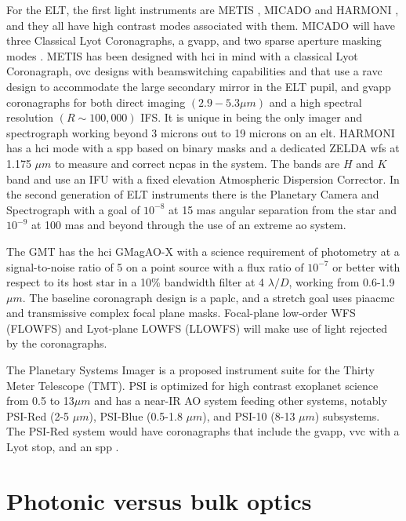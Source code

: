 \documentclass[letterpaper]{ar-1col}
\newcommand{\ld}{$\lambda/D$}
\begin{document}
For the ELT, the first light instruments are METIS \citep{Brandl22}, MICADO \citep{Sturm24} and HARMONI \citep{Thatte22}, and they all have high contrast modes associated with them.
%
MICADO will have three Classical Lyot Coronagraphs, a \ac{gvapp}, and two sparse aperture masking modes \citep{Huby24}. 
%
METIS has been designed with \ac{hci} in mind \citep{Kenworthy16,Absil24} with a classical Lyot Coronagraph, \ac{ovc} designs with beamswitching capabilities and that use a \ac{ravc} design to accommodate the large secondary mirror in the ELT pupil, and \ac{gvapp} coronagraphs for both direct imaging $(2.9-5.3\mu m)$ and a high spectral resolution $(R\sim 100,000)$ IFS.
%
It is unique in being the only imager and spectrograph working beyond 3 microns out to 19 microns on an \ac{elt}.
%
HARMONI has a \ac{hci} mode \citep{Houlle21} with a \ac{spp} based on binary masks \citep{Carlotti23} and a dedicated ZELDA \ac{wfs} at 1.175 $\mu m$ to measure and correct \acp{ncpa} in the system.
%
The bands are $H$ and $K$ band and use an IFU with a fixed elevation Atmospheric Dispersion Corrector.
%
In the second generation of ELT instruments there is the Planetary Camera and Spectrograph \citep[PCS; ][]{Kasper21} with a goal of $10^{-8}$ at 15 mas angular separation from the star and $10^{-9}$ at 100 mas and beyond through the use of an extreme \ac{ao} system. 

The GMT	has the \ac{hci} GMagAO-X \citep{Males24} with a science requirement of photometry at a signal-to-noise ratio of 5 on a point source with a flux ratio of $10^{-7}$ or better with respect to its host star in a 10\% bandwidth filter at 4 \ld{}, working from 0.6-1.9 $\mu m$.
%
The baseline coronagraph design is a \ac{paplc}, and a stretch goal uses \ac{piaacmc} and transmissive complex focal plane masks.
%
Focal-plane low-order WFS (FLOWFS) and Lyot-plane LOWFS (LLOWFS) will make use of light rejected by the coronagraphs.

The Planetary Systems Imager \citep[PSI; ][]{Fitzgerald22} is a proposed instrument suite for the Thirty Meter Telescope (TMT).
%
PSI is optimized for high contrast exoplanet science from 0.5 to 13$\mu m$ and has a near-IR AO system feeding other systems, notably PSI-Red (2-5 $\mu m$), PSI-Blue (0.5-1.8 $\mu m$), and PSI-10 (8-13 $\mu m$) subsystems. 
%
The PSI-Red system would have coronagraphs that include the \ac{gvapp}, \ac{vvc} with a Lyot stop, and an \ac{spp} \citep{Jensen-Clem21}.

\section{Photonic versus bulk optics}
\end{document}
